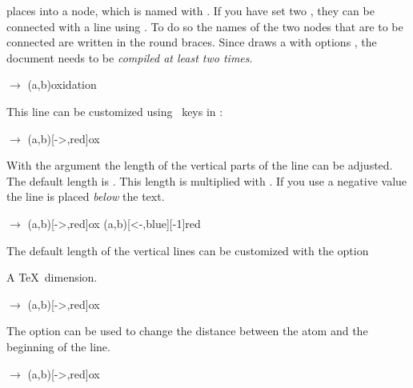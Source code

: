 \documentclass{chemmacros-manual}
\begin{document}
 places  into a node, which is named with .  If
you have set two , they can be connected with a line using .
To do so the names of the two nodes that are to be connected are written in
the round braces.  Since  draws a  with options
, the document needs to be \emph{compiled at
  least two times}.

\begin{example}
  \vspace{7mm}
   $\rightarrow$ \pch\redox(a,b){oxidation}
\end{example}

This line can be customized using \TikZ\ keys in :
\begin{example}
  \vspace{7mm}
   $\rightarrow$ \pch\redox(a,b)[->,red]{ox}
\end{example}

With the argument  the length of the vertical parts of the line can
be adjusted.  The default length is \code{.6em}.  This length is multiplied
with .  If you use a negative value the line is placed \emph{below}
the text.
\begin{example}
  \vspace{7mm}
   $\rightarrow$ \pch
  \redox(a,b)[->,red]{ox}
  \redox(a,b)[<-,blue][-1]{red}
  \vspace{7mm}
\end{example}

The default length of the vertical lines can be customized with the option
\begin{options}
  \Default{.6em}
    A \TeX\ dimension.
\end{options}

\begin{example}
  \vspace{7mm}
   $\rightarrow$ \pch\redox(a,b)[->,red]{ox}
\end{example}

\begin{options}
  \Default{.2em}
    The option can be used to change the distance between the atom and the
    beginning of the line.
\end{options}

\begin{example}
  \vspace{7mm}
   $\rightarrow$ \pch\redox(a,b)[->,red]{ox}
\end{example}
\end{document}
